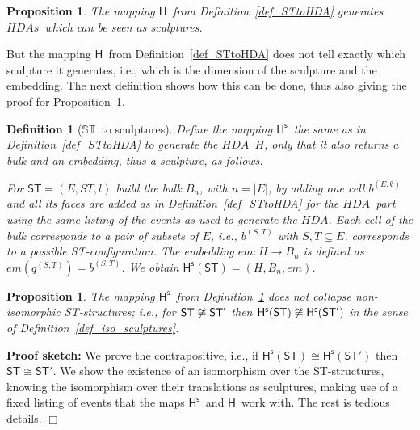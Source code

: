 \documentclass[submission,copyright,creativecommons]{eptcs}
\newtheorem{proposition}[theorem]{Proposition}
\newtheorem{definition}[theorem]{Definition}
\newenvironment{proof}[1][\!\!\,]{\vspace{1ex}\noindent\textbf{Proof #1: }}{\hfill$\Box$\vspace{2ex}}
\newcommand\HDA{\ensuremath{\mathit{HDA}}}
\newcommand\HDAs{\ensuremath{\mathit{HDAs}}}
\newcommand\ST{\ensuremath{\mathsf{ST}}}
\newcommand\allST{\ensuremath{\mathbb{ST}}}
\newcommand\isomorphic{\ensuremath{\cong}}
\newcommand\stintoh{\ensuremath{\mathsf{H}}}
\newcommand\stintosculpture{\ensuremath{\stintoh^{\mathsf{s}}}}
\newcommand\embedMorphism{\ensuremath{\mathit{em}}}
\begin{document}
\begin{proposition}\label{prop_HgivesSculptures}
The mapping \stintoh\ from Definition~\ref{def_STtoHDA} generates \HDAs\ which can be seen as sculptures.
\end{proposition}


But the mapping \stintoh\ from Definition~\ref{def_STtoHDA} does not tell exactly which sculpture it generates, i.e., which is the dimension of the sculpture and the embedding.
The next definition shows how this can be done, thus also giving the proof for Proposition~\ref{prop_HgivesSculptures}.

\begin{definition}[\allST\ to sculptures]\label{def_stintosculptures}
Define the mapping \stintosculpture\ the same as in Definition~\ref{def_STtoHDA} to generate the \HDA\ $H$, only that it also returns a bulk and an embedding, thus a sculpture, as follows.

For $\ST=(E,ST,l)$ build the bulk $B_{n}$, with $n=|E|$, by adding one cell $b^{(E,\emptyset)}$ and all its faces are added as in Definition~\ref{def_STtoHDA} for the \HDA\ part using the same listing of the events as used to generate the \HDA. Each cell of the bulk corresponds to a pair of subsets of $E$, i.e., $b^{(S,T)}$ with $S,T\subseteq E$, corresponds to a possible ST-configuration. 
The embedding $\embedMorphism:H\rightarrow B_{n}$ is defined as $\embedMorphism(q^{(S,T)})=b^{(S,T)}$.
We obtain $\stintosculpture(\ST)=(H,B_{n},\embedMorphism)$.
\end{definition}

\begin{proposition}
The mapping \stintosculpture\ from Definition~\ref{def_stintosculptures} does not collapse non-isomorphic ST-structures; i.e., for $\ST\not\isomorphic\ST'$ then $\stintosculpture(\ST)\not\isomorphic\stintosculpture(\ST')$ in the sense of Definition~\ref{def_iso_sculptures}.
\end{proposition}

\begin{proof}[sketch]
We prove the contrapositive, i.e., if $\stintosculpture(\ST)\isomorphic\stintosculpture(\ST')$ then $\ST\isomorphic\ST'$. We show the existence of an isomorphism over the ST-structures, knowing the isomorphism over their translations as sculptures, making use of a fixed listing of events that the maps \stintosculpture\ and \stintoh\ work with.
The rest is tedious details.
\end{proof}
\end{document}
